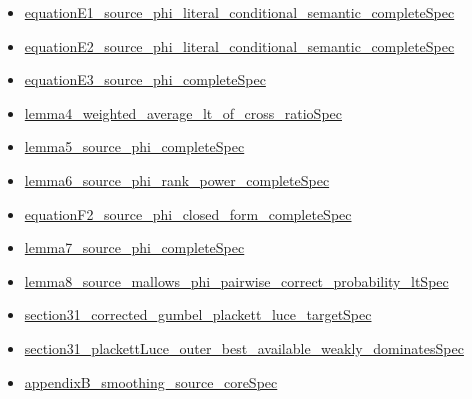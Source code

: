 \documentclass[10pt]{article}
\begin{document}
\begin{itemize}[leftmargin=1.2em]
\begin{itemize}[leftmargin=1.2em]
\item \hyperlink{source-claim-c7560a9682e8906d}{equation\allowbreak{}E1\_\allowbreak{}source\_\allowbreak{}phi\_\allowbreak{}literal\_\allowbreak{}conditional\_\allowbreak{}semantic\_\allowbreak{}complete\allowbreak{}Spec}
\item \hyperlink{source-claim-73dd5d1917ec1a7c}{equation\allowbreak{}E2\_\allowbreak{}source\_\allowbreak{}phi\_\allowbreak{}literal\_\allowbreak{}conditional\_\allowbreak{}semantic\_\allowbreak{}complete\allowbreak{}Spec}
\item \hyperlink{source-claim-027748e89e133285}{equation\allowbreak{}E3\_\allowbreak{}source\_\allowbreak{}phi\_\allowbreak{}complete\allowbreak{}Spec}
\item \hyperlink{source-claim-f5654e8ee63c4d5d}{lemma4\_\allowbreak{}weighted\_\allowbreak{}average\_\allowbreak{}lt\_\allowbreak{}of\_\allowbreak{}cross\_\allowbreak{}ratio\allowbreak{}Spec}
\item \hyperlink{source-claim-938117e3246c9b41}{lemma5\_\allowbreak{}source\_\allowbreak{}phi\_\allowbreak{}complete\allowbreak{}Spec}
\item \hyperlink{source-claim-7ef5e5254a6c73ab}{lemma6\_\allowbreak{}source\_\allowbreak{}phi\_\allowbreak{}rank\_\allowbreak{}power\_\allowbreak{}complete\allowbreak{}Spec}
\item \hyperlink{source-claim-4e3a949fd1ab09f3}{equation\allowbreak{}F2\_\allowbreak{}source\_\allowbreak{}phi\_\allowbreak{}closed\_\allowbreak{}form\_\allowbreak{}complete\allowbreak{}Spec}
\item \hyperlink{source-claim-1e4808a386b72297}{lemma7\_\allowbreak{}source\_\allowbreak{}phi\_\allowbreak{}complete\allowbreak{}Spec}
\item \hyperlink{source-claim-961880e0b1d1c772}{lemma8\_\allowbreak{}source\_\allowbreak{}mallows\_\allowbreak{}phi\_\allowbreak{}pairwise\_\allowbreak{}correct\_\allowbreak{}probability\_\allowbreak{}lt\allowbreak{}Spec}
\item \hyperlink{source-claim-2d4c1840ef47dce5}{section31\_\allowbreak{}corrected\_\allowbreak{}gumbel\_\allowbreak{}plackett\_\allowbreak{}luce\_\allowbreak{}target\allowbreak{}Spec}
\item \hyperlink{source-claim-e12ec3045f35c0cc}{section31\_\allowbreak{}plackett\allowbreak{}Luce\_\allowbreak{}outer\_\allowbreak{}best\_\allowbreak{}available\_\allowbreak{}weakly\_\allowbreak{}dominates\allowbreak{}Spec}
\item \hyperlink{source-claim-4cfc28215a7bcccf}{appendix\allowbreak{}B\_\allowbreak{}smoothing\_\allowbreak{}source\_\allowbreak{}core\allowbreak{}Spec}
\end{itemize}
\end{itemize}
\end{document}
